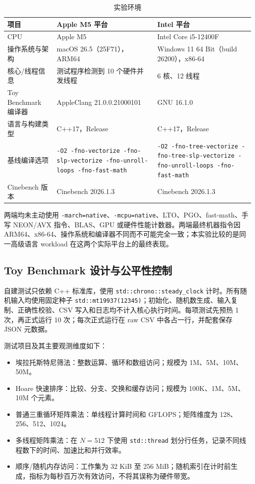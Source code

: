 \documentclass[UTF8,a4paper,12pt]{ctexart}
\begin{document}
\begin{table}[H]
    \centering
    \renewcommand{\arraystretch}{1.35}
    \caption{实验环境}
    \label{tab:environment}
    \small
    \begin{tabular}{p{3.0cm} p{5.0cm} p{5.0cm}}
        \hline
        项目 & Apple M5 平台 & Intel 平台 \\
        \hline
        CPU & Apple M5 & Intel Core i5-12400F \\
        操作系统与架构 & macOS 26.5（25F71），ARM64 & Windows 11 64 Bit（build 26200），x86-64 \\
        核心/线程信息 & 测试程序检测到 10 个硬件并发线程 & 6 核、12 线程 \\
        Toy Benchmark 编译器 & AppleClang 21.0.0.21000101 & GNU 16.1.0 \\
        语言与构建类型 & C++17，Release & C++17，Release \\
        基线编译选项 & \texttt{-O2 -fno-vectorize -fno-slp-vectorize -fno-unroll-loops -fno-fast-math} & \texttt{-O2 -fno-tree-vectorize -fno-tree-slp-vectorize -fno-unroll-loops -fno-fast-math} \\
        Cinebench 版本 & Cinebench 2026.1.3 & Cinebench 2026.1.3 \\
        \hline
    \end{tabular}
\end{table}

两端均未主动使用 \texttt{-march=native}、\texttt{-mcpu=native}、LTO、PGO、fast-math、手写 NEON/AVX 指令、BLAS、GPU 或硬件性能计数器。两端最终机器指令因 ARM64、x86-64、操作系统和编译器不同而不可能完全一致；本实验比较的是同一高级语言 workload 在这两个实际平台上的最终表现。

\subsection{Toy Benchmark 设计与公平性控制}

自建测试只依赖 C++ 标准库，使用 \texttt{std::chrono::steady\_clock} 计时。所有随机输入均使用固定种子 \texttt{std::mt19937(12345)}；初始化、随机数生成、输入复制、正确性校验、CSV 写入和日志均不计入核心执行时间。每项测试先预热 1 次，再正式运行 10 次；每次正式运行在 raw CSV 中各占一行，并配套保存 JSON 元数据。

测试项目及其主要观测维度如下：

\begin{itemize}
\item 埃拉托斯特尼筛法：整数运算、循环和数组访问；规模为 1M、5M、10M、50M。
\item Hoare 快速排序：比较、分支、交换和缓存访问；规模为 100K、1M、5M、10M 个元素。
\item 普通三重循环矩阵乘法：单线程计算时间和 GFLOPS；矩阵维度为 128、256、512、1024。
\item 多线程矩阵乘法：在 $N=512$ 下使用 \texttt{std::thread} 划分行任务，记录不同线程数下的时间、加速比和并行效率。
\item 顺序/随机内存访问：工作集为 32 KiB 至 256 MiB；随机索引在计时前生成，指标为每秒百万次有效访问，不将其误称为硬件带宽。
\end{itemize}
\end{document}
